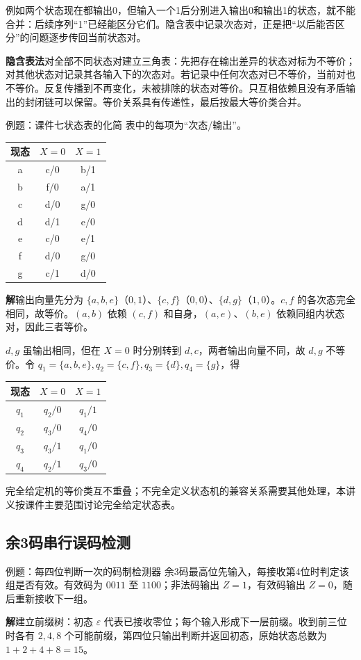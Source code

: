 \documentclass[UTF8,fontset=none,zihao=-4,a4paper]{ctexart}
\newcommand{\term}[1]{\textbf{#1}}
\newcommand{\sol}{\par\noindent\textbf{解}\quad}
\begin{document}
例如两个状态现在都输出0，但输入一个1后分别进入输出0和输出1的状态，就不能合并：后续序列“1”已经能区分它们。隐含表中记录次态对，正是把“以后能否区分”的问题逐步传回当前状态对。

\term{隐含表法}对全部不同状态对建立三角表：先把存在输出差异的状态对标为不等价；对其他状态对记录其各输入下的次态对。若记录中任何次态对已不等价，当前对也不等价。反复传播到不再变化，未被排除的状态对等价。只互相依赖且没有矛盾输出的封闭链可以保留。等价关系具有传递性，最后按最大等价类合并。
\begin{infobox}{例题：课件七状态表的化简}
表中的每项为“次态/输出”。
\begin{center}
\begin{tabular}{c cc}
\toprule 现态&$X=0$&$X=1$\\\midrule
a&c/0&b/1\\b&f/0&a/1\\c&d/0&g/0\\d&d/1&e/0\\
e&c/0&e/1\\f&d/0&g/0\\g&c/1&d/0\\\bottomrule
\end{tabular}
\end{center}
\end{infobox}
\sol 输出向量先分为 $\{a,b,e\}$（$0,1$）、$\{c,f\}$（$0,0$）、$\{d,g\}$（$1,0$）。$c,f$ 的各次态完全相同，故等价。$(a,b)$ 依赖 $(c,f)$ 和自身，$(a,e)$、$(b,e)$ 依赖同组内状态对，因此三者等价。

$d,g$ 虽输出相同，但在 $X=0$ 时分别转到 $d,c$，两者输出向量不同，故 $d,g$ 不等价。令 $q_1=\{a,b,e\},q_2=\{c,f\},q_3=\{d\},q_4=\{g\}$，得
\begin{center}
\begin{tabular}{c cc}
\toprule 现态&$X=0$&$X=1$\\\midrule
$q_1$&$q_2/0$&$q_1/1$\\$q_2$&$q_3/0$&$q_4/0$\\
$q_3$&$q_3/1$&$q_1/0$\\$q_4$&$q_2/1$&$q_3/0$\\\bottomrule
\end{tabular}
\end{center}
完全给定机的等价类互不重叠；不完全定义状态机的兼容关系需要其他处理，本讲义按课件主要范围讨论完全给定状态表。

\subsection{余3码串行误码检测}
\begin{infobox}{例题：每四位判断一次的码制检测器}
余3码最高位先输入，每接收第4位时判定该组是否有效。有效码为 $0011$ 至 $1100$；非法码输出 $Z=1$，有效码输出 $Z=0$，随后重新接收下一组。
\end{infobox}
\sol 建立前缀树：初态 $\varepsilon$ 代表已接收零位；每个输入形成下一层前缀。收到前三位时各有 $2,4,8$ 个可能前缀，第四位只输出判断并返回初态，原始状态总数为 $1+2+4+8=15$。
\end{document}
